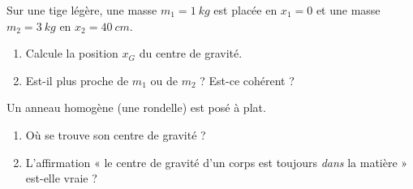 \documentclass[11pt,a4paper]{article}
\begin{document}
\begin{exo}
Sur une tige légère, une masse $m_1=\qty{1}{kg}$ est placée en $x_1=0$ et une masse $m_2=\qty{3}{kg}$
en $x_2=\qty{40}{cm}$.
\begin{enumerate}[label=\alph*)]
  \item Calcule la position $x_G$ du centre de gravité.
  \item Est-il plus proche de $m_1$ ou de $m_2$ ? Est-ce cohérent ?
\end{enumerate}
\end{exo}

\begin{exo}
Un anneau homogène (une rondelle) est posé à plat.
\begin{center}
\end{center}
\begin{enumerate}[label=\alph*)]
  \item Où se trouve son centre de gravité ?
  \item L'affirmation « le centre de gravité d'un corps est toujours \emph{dans} la matière » est-elle
        vraie ?
\end{enumerate}
\end{exo}
\end{document}
